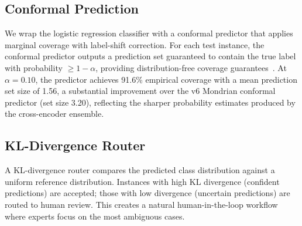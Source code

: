 \subsection{Conformal Prediction}

We wrap the logistic regression classifier with a conformal predictor
that applies marginal coverage with label-shift correction. For each
test instance, the conformal predictor outputs a prediction set
guaranteed to contain the true label with probability
$\geq 1-\alpha$, providing distribution-free coverage
guarantees~\citep{vovk2005conformal, romano2020malice}. At
$\alpha = 0.10$, the predictor achieves 91.6\% empirical coverage with
a mean prediction set size of 1.56, a substantial improvement over the
v6 Mondrian conformal predictor (set size 3.20), reflecting the
sharper probability estimates produced by the cross-encoder ensemble.

\subsection{KL-Divergence Router}

A KL-divergence router compares the predicted class distribution against
a uniform reference distribution. Instances with high KL divergence
(confident predictions) are accepted; those with low divergence
(uncertain predictions) are routed to human review. This creates a
natural human-in-the-loop workflow where experts focus on the most
ambiguous cases.
